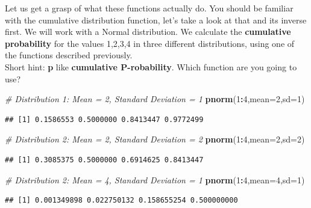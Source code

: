 \documentclass[
]{book}
\newenvironment{Shaded}{\begin{snugshade}}{\end{snugshade}}
\newcommand{\AttributeTok}[1]{\textcolor[rgb]{0.13,0.29,0.53}{#1}}
\newcommand{\CommentTok}[1]{\textcolor[rgb]{0.56,0.35,0.01}{\textit{#1}}}
\newcommand{\DecValTok}[1]{\textcolor[rgb]{0.00,0.00,0.81}{#1}}
\newcommand{\FunctionTok}[1]{\textcolor[rgb]{0.13,0.29,0.53}{\textbf{#1}}}
\newcommand{\NormalTok}[1]{#1}
\newcommand{\SpecialCharTok}[1]{\textcolor[rgb]{0.81,0.36,0.00}{\textbf{#1}}}
\begin{document}
Let us get a grasp of what these functions actually do. You should be familiar with the cumulative distribution function, let's take a look at that and its inverse first. We will work with a Normal distribution. We calculate the \textbf{cumulative probability} for the values 1,2,3,4 in three different distributions, using one of the functions described previously.\\
Short hint: \textbf{p} like \textbf{cumulative P-robability}. Which function are you going to use?

\begin{Shaded}
\begin{Highlighting}[]
\CommentTok{\# Distribution 1: Mean = 2, Standard Deviation = 1}
\FunctionTok{pnorm}\NormalTok{(}\DecValTok{1}\SpecialCharTok{:}\DecValTok{4}\NormalTok{,}\AttributeTok{mean=}\DecValTok{2}\NormalTok{,}\AttributeTok{sd=}\DecValTok{1}\NormalTok{)}
\end{Highlighting}
\end{Shaded}

\begin{verbatim}
## [1] 0.1586553 0.5000000 0.8413447 0.9772499
\end{verbatim}

\begin{Shaded}
\begin{Highlighting}[]
\CommentTok{\# Distribution 2: Mean = 2, Standard Deviation = 2}
\FunctionTok{pnorm}\NormalTok{(}\DecValTok{1}\SpecialCharTok{:}\DecValTok{4}\NormalTok{,}\AttributeTok{mean=}\DecValTok{2}\NormalTok{,}\AttributeTok{sd=}\DecValTok{2}\NormalTok{)}
\end{Highlighting}
\end{Shaded}

\begin{verbatim}
## [1] 0.3085375 0.5000000 0.6914625 0.8413447
\end{verbatim}

\begin{Shaded}
\begin{Highlighting}[]
\CommentTok{\# Distribution 2: Mean = 4, Standard Deviation = 1}
\FunctionTok{pnorm}\NormalTok{(}\DecValTok{1}\SpecialCharTok{:}\DecValTok{4}\NormalTok{,}\AttributeTok{mean=}\DecValTok{4}\NormalTok{,}\AttributeTok{sd=}\DecValTok{1}\NormalTok{)}
\end{Highlighting}
\end{Shaded}

\begin{verbatim}
## [1] 0.001349898 0.022750132 0.158655254 0.500000000
\end{verbatim}
\end{document}
